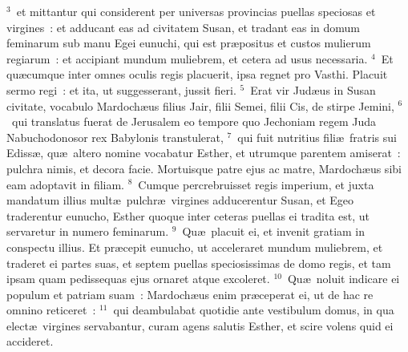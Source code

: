 ${}^{3}$~et mittantur qui considerent per universas provincias puellas speciosas et virgines~: et adducant eas ad civitatem Susan, et tradant eas in domum feminarum sub manu Egei eunuchi, qui est pr\ae positus et custos mulierum regiarum~: et accipiant mundum muliebrem, et cetera ad usus necessaria.
${}^{4}$~Et qu\ae cumque inter omnes oculis regis placuerit, ipsa regnet pro Vasthi. Placuit sermo regi~: et ita, ut suggesserant, jussit fieri.
${}^{5}$~Erat vir Jud\ae us in Susan civitate, vocabulo Mardoch\ae us filius Jair, filii Semei, filii Cis, de stirpe Jemini,
${}^{6}$~qui translatus fuerat de Jerusalem eo tempore quo Jechoniam regem Juda Nabuchodonosor rex Babylonis transtulerat,
${}^{7}$~qui fuit nutritius fili\ae\ fratris sui Ediss\ae , qu\ae\ altero nomine vocabatur Esther, et utrumque parentem amiserat~: pulchra nimis, et decora facie. Mortuisque patre ejus ac matre, Mardoch\ae us sibi eam adoptavit in filiam.
${}^{8}$~Cumque percrebruisset regis imperium, et juxta mandatum illius mult\ae\ pulchr\ae\ virgines adducerentur Susan, et Egeo traderentur eunucho, Esther quoque inter ceteras puellas ei tradita est, ut servaretur in numero feminarum.
${}^{9}$~Qu\ae\ placuit ei, et invenit gratiam in conspectu illius. Et pr\ae cepit eunucho, ut acceleraret mundum muliebrem, et traderet ei partes suas, et septem puellas speciosissimas de domo regis, et tam ipsam quam pedissequas ejus ornaret atque excoleret.
${}^{10}$~Qu\ae\ noluit indicare ei populum et patriam suam~: Mardoch\ae us enim pr\ae ceperat ei, ut de hac re omnino reticeret~:
${}^{11}$~qui deambulabat quotidie ante vestibulum domus, in qua elect\ae\ virgines servabantur, curam agens salutis Esther, et scire volens quid ei accideret.


